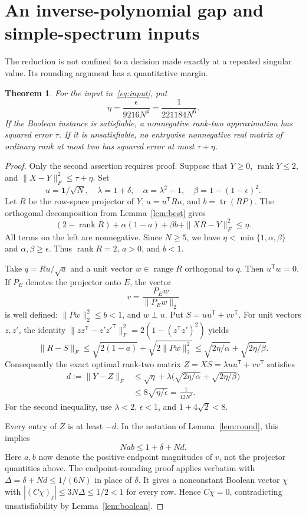 \documentclass[11pt]{article}
\newtheorem{theorem}{Theorem}
\newcommand{\rank}{\operatorname{rank}}
\newcommand{\tr}{\operatorname{tr}}
\newcommand{\one}{\mathbf 1}
\begin{document}
\section{An inverse-polynomial gap and simple-spectrum inputs}
The reduction is not confined to a decision made exactly at a repeated singular value. Its rounding argument has a quantitative margin.

\begin{theorem}\label{thm:gap}
For the input in~\eqref{eq:input}, put
\[
 \eta=\frac{\epsilon}{9216N^4}=\frac1{221184N^6}.
\]
If the Boolean instance is satisfiable, a nonnegative rank-two approximation has squared error $\tau$. If it is unsatisfiable, no entrywise nonnegative real matrix of ordinary rank at most two has squared error at most $\tau+\eta$.
\end{theorem}
\begin{proof}
Only the second assertion requires proof. Suppose that $Y\geq0$, $\rank Y\leq2$, and $\|X-Y\|_F^2\leq\tau+\eta$. Set
\[
 u=\one/\sqrt N,\quad \lambda=1+\delta,\quad
 \alpha=\lambda^2-1,\quad \beta=1-(1-\epsilon)^2.
\]
Let $R$ be the row-space projector of $Y$, $a=u^{\mathsf T}Ru$, and $b=\tr(RP)$. The orthogonal decomposition from Lemma~\ref{lem:best} gives
\begin{equation}\label{eq:gaploss}
 (2-\rank R)+\alpha(1-a)+\beta b+\|XR-Y\|_F^2\leq\eta.
\end{equation}
All terms on the left are nonnegative. Since $N\geq5$, we have $\eta<\min\{1,\alpha,\beta\}$ and $\alpha,\beta\geq\epsilon$. Thus $\rank R=2$, $a>0$, and $b<1$.

Take $q=Ru/\sqrt a$ and a unit vector $w\in\operatorname{range}R$ orthogonal to $q$. Then $u^{\mathsf T}w=0$. If $P_E$ denotes the projector onto $E$, the vector
\[
 v=\frac{P_Ew}{\|P_Ew\|_2}
\]
is well defined: $\|Pw\|_2^2\leq b<1$, and $w\perp u$. Put $S=uu^{\mathsf T}+vv^{\mathsf T}$. For unit vectors $z,z'$, the identity
$\|zz^{\mathsf T}-z'z'^{\mathsf T}\|_F^2=2(1-(z^{\mathsf T}z')^2)$ yields
\[
 \|R-S\|_F
 \leq\sqrt{2(1-a)}+\sqrt{2\|Pw\|_2^2}
 \leq\sqrt{2\eta/\alpha}+\sqrt{2\eta/\beta}.
\]
Consequently the exact optimal rank-two matrix
$Z=XS=\lambda uu^{\mathsf T}+vv^{\mathsf T}$ satisfies
\begin{align*}
 d:=\|Y-Z\|_F
 &\leq\sqrt\eta+\lambda\bigl(\sqrt{2\eta/\alpha}+\sqrt{2\eta/\beta}\bigr)\\
 &\leq8\sqrt{\eta/\epsilon}
 =\frac1{12N^2}.
\end{align*}
For the second inequality, use $\lambda<2$, $\epsilon<1$, and $1+4\sqrt2<8$.

Every entry of $Z$ is at least $-d$. In the notation of Lemma~\ref{lem:round}, this implies
\[
 Nab\leq1+\delta+Nd.
\]
Here $a,b$ now denote the positive endpoint magnitudes of $v$, not the projector quantities above. The endpoint-rounding proof applies verbatim with
$\Delta=\delta+Nd\leq1/(6N)$ in place of $\delta$. It gives a nonconstant Boolean vector $\chi$ with
$|(C\chi)_j|\leq3N\Delta\leq1/2<1$ for every row. Hence $C\chi=0$, contradicting unsatisfiability by Lemma~\ref{lem:boolean}.
\end{proof}
\end{document}
